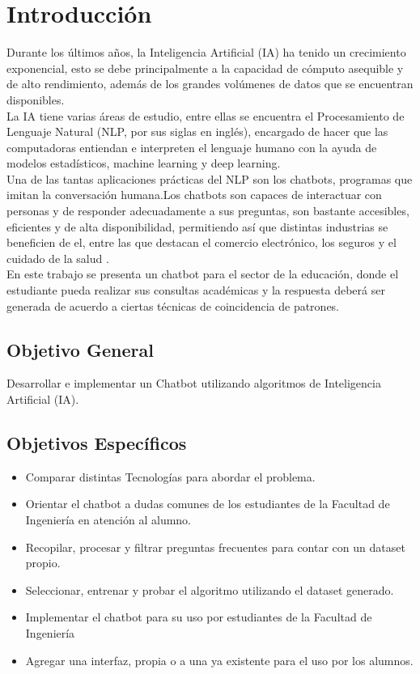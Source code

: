 \chapter[Introducción]{Introducción}
Durante los últimos años, la Inteligencia Artificial (IA) ha tenido un crecimiento exponencial,
esto se debe principalmente a la capacidad de cómputo asequible y de alto rendimiento, además de
los grandes volúmenes de datos que se encuentran disponibles.\cite{Oracle}\\
\indent La IA tiene varias áreas de estudio, entre ellas se encuentra el Procesamiento de Lenguaje
Natural (NLP, por sus siglas en inglés), encargado de hacer que las computadoras entiendan e
interpreten el lenguaje humano con la ayuda de modelos estadísticos, machine learning y deep
learning.\\
\indent Una de las tantas aplicaciones prácticas del NLP son los chatbots, programas que imitan la
conversación humana.Los chatbots son capaces de interactuar con personas y de responder
adecuadamente a sus preguntas, son bastante accesibles, eficientes y de alta disponibilidad,
permitiendo así que distintas industrias se beneficien de el, entre las que destacan el comercio
electrónico, los seguros y el cuidado de la salud .\cite{building_chat-bots-with-python}\\
\indent En este trabajo se presenta un chatbot para el sector de la educación, donde el estudiante
pueda realizar sus consultas académicas y la respuesta deberá ser generada de acuerdo a ciertas
técnicas de coincidencia de patrones.

\section{Objetivo General}
Desarrollar e implementar un Chatbot utilizando algoritmos de Inteligencia Artificial (IA).

\section{Objetivos Específicos}
\begin{itemize}
	\item Comparar distintas Tecnologías para abordar el problema.
	\item Orientar el chatbot a dudas comunes de los estudiantes de la Facultad de Ingeniería en
	      atención al alumno.
	\item Recopilar, procesar y filtrar preguntas frecuentes para contar con un dataset propio.
	\item Seleccionar, entrenar y probar el algoritmo utilizando el dataset generado.
	\item Implementar el chatbot para su uso por estudiantes de la Facultad de Ingeniería
	\item Agregar una interfaz, propia o a una ya existente para el uso por los alumnos.
\end{itemize}

